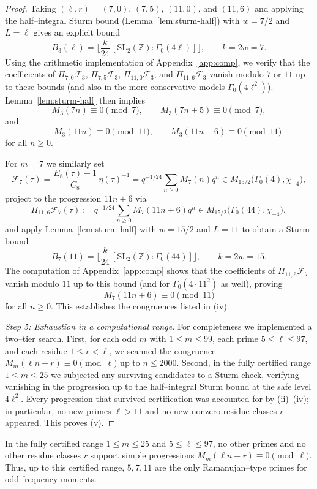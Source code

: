 \documentclass[11pt]{article}
\theoremstyle{definition}
\theoremstyle{remark}
\begin{document}
\begin{proof}
Taking $(\ell,r)=(7,0)$, $(7,5)$, $(11,0)$, and $(11,6)$ and applying the
half--integral Sturm bound (Lemma~\ref{lem:sturm-half}) with $w=7/2$
and $L=\ell$ gives an explicit bound
\[
B_3(\ell)
=\Big\lfloor\frac{k}{24}\,[\mathrm{SL}_2(\mathbb{Z}):\Gamma_0(4\ell)]\Big\rfloor,
\qquad k=2w=7.
\]
Using the arithmetic implementation of Appendix~\ref{app:comp}, we verify
that the coefficients of $\Pi_{7,0}\mathcal{F}_3$, $\Pi_{7,5}\mathcal{F}_3$,
$\Pi_{11,0}\mathcal{F}_3$, and $\Pi_{11,6}\mathcal{F}_3$ vanish modulo $7$
or $11$ up to these bounds (and also in the more conservative models
$\Gamma_0(4\ell^2)$).  Lemma~\ref{lem:sturm-half} then implies
\[
M_3(7n)\equiv0\pmod7,\qquad
M_3(7n+5)\equiv0\pmod7,\]
and \[\qquad
M_3(11n)\equiv0\pmod{11},\qquad
M_3(11n+6)\equiv0\pmod{11}
\]
for all $n\ge0$.

For $m=7$ we similarly set
\[
\mathcal{F}_7(\tau)
=\frac{E_8(\tau)-1}{C_8}\,\eta(\tau)^{-1}
= q^{-1/24}\sum_{n\ge0}M_7(n)q^n
\in M_{15/2}\bigl(\Gamma_0(4),\chi_{-4}\bigr),
\]
project to the progression $11n+6$ via
\[
\Pi_{11,6}\mathcal{F}_7(\tau)
:= q^{-1/24}\sum_{n\ge0}M_7(11n+6)q^n
\in M_{15/2}\bigl(\Gamma_0(44),\chi_{-4}\bigr),
\]
and apply Lemma~\ref{lem:sturm-half} with $w=15/2$ and $L=11$ to obtain
a Sturm bound
\[
B_7(11)
=\Big\lfloor\frac{k}{24}\,[\mathrm{SL}_2(\mathbb{Z}):\Gamma_0(44)]\Big\rfloor,
\qquad k=2w=15.
\]
The computation of Appendix~\ref{app:comp} shows that the coefficients of
$\Pi_{11,6}\mathcal{F}_7$ vanish modulo $11$ up to this bound (and for
$\Gamma_0(4\cdot11^2)$ as well), proving
\[
M_7(11n+6)\equiv0\pmod{11}
\]
for all $n\ge0$.  This establishes the congruences listed in \textup{(iv)}.

\smallskip
\emph{Step 5: Exhaustion in a computational range.}
For completeness we implemented a two--tier search.
First, for each odd $m$ with $1\le m\le99$, each prime $5\le\ell\le97$, and each
residue $1\le r<\ell$, we scanned the congruence
$M_m(\ell n+r)\equiv0\pmod{\ell}$ up to $n\le2000$.
Second, in the fully certified range $1\le m\le25$ we subjected any surviving
candidates to a Sturm check, verifying vanishing in the progression up to the
half--integral Sturm bound at the safe level $4\ell^2$.
Every progression that survived certification was accounted for by
\textup{(ii)}–\textup{(iv)}; in particular, no new primes $\ell>11$ and no new
nonzero residue classes $r$ appeared.  This proves \textup{(v)}.

\end{proof}


In the fully certified range $1\le m\le25$ and $5\le\ell\le97$, no other primes
and no other residue classes $r$ support simple progressions
$M_m(\ell n+r)\equiv0\pmod{\ell}$.  Thus, up to this certified range,
$5,7,11$ are the only Ramanujan--type primes for odd frequency moments.
\end{document}
